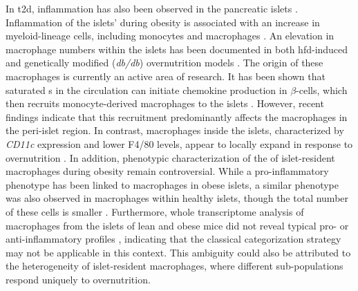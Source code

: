 \par In \gls{t2d}, inflammation has also been observed in the pancreatic islets \textbf{\cite{boni-schnetzler_islet_2019}}. Inflammation of the islets’ during obesity is associated with an increase in myeloid-lineage cells, including monocytes and macrophages \textbf{\cite{eguchi_islet_2017,ying_role_2019}}. An elevation in macrophage numbers within the islets has been documented in both \gls{hfd}-induced \textbf{\cite{ehses_increased_2007}} and genetically modified (\textit{db/db}) overnutrition models \textbf{\cite{cucak_accumulation_2014}}. The origin of these macrophages is currently an active area of research. It has been shown that saturated s in the circulation can initiate chemokine production in $\beta$-cells, which then recruits monocyte-derived macrophages to the islets \textbf{\cite{eguchi_saturated_2012}}. However, recent findings indicate that this recruitment predominantly affects the macrophages in the peri-islet region. In contrast, macrophages inside the islets, characterized by \textit{CD11c} expression and lower F4/80 levels, appear to locally expand in response to overnutrition \textbf{\cite{ying_expansion_2019}}. In addition, phenotypic characterization of the of islet-resident macrophages during obesity remain controversial. While a pro-inflammatory phenotype has been linked to macrophages in obese islets, a similar phenotype was also observed in macrophages within healthy islets, though the total number of these cells is smaller \textbf{\cite{cucak_accumulation_2014}}. Furthermore, whole transcriptome analysis of macrophages from the islets of lean and obese mice did not reveal typical pro- or anti-inflammatory profiles \textbf{\cite{ying_expansion_2019}}, indicating that the classical categorization strategy may not be applicable in this context. This ambiguity could also be attributed to the heterogeneity of islet-resident macrophages, where different sub-populations respond uniquely to overnutrition.\\

